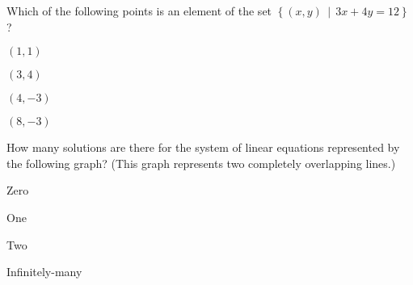 \begin{readinessAssuranceTest}
%

\item Which of the following points is an element of the set 
		\(\displaystyle \left\{ (x,y) \,\middle|\, 3x+4y=12 \right\}\) ?
\begin{multicols}{4}
\begin{readinessAssuranceTestChoices}
\item \( (1,1) \)
\item \( (3,4) \)
\item \( (4,-3) \)
\item \( (8,-3) \) %
\end{readinessAssuranceTestChoices}
\end{multicols}

\item How many solutions are there for the system of linear equations
      represented by the following graph? (This graph represents two completely
      overlapping lines.)
    \begin{center}
      \systemWithInfinitelyManySolutions
    \end{center}

\begin{multicols}{4}
\begin{readinessAssuranceTestChoices}
\item Zero
\item One
\item Two
\item Infinitely-many %
\end{readinessAssuranceTestChoices}
\end{multicols}



\end{readinessAssuranceTest}
